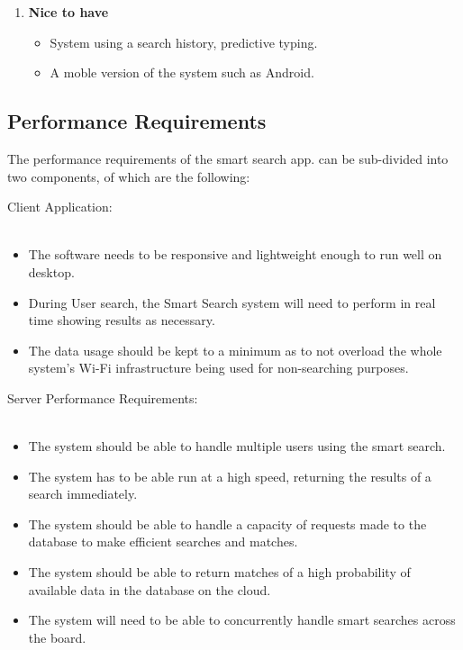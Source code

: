\documentclass[a4paper,10pt]{article}
\begin{document}
{\begin{enumerate}
		\item \textbf{Nice to have}
		\begin{itemize}
		\item System using a search history, predictive typing. 
		\item A moble version of the system such as Android.
		\end{itemize}
		\end{enumerate} 

	\subsection{Performance Requirements}
	The performance requirements of the smart search app. can be sub-divided into two components, of which are the following:
	
	\item Client Application:\\\\
		\begin{itemize}
		\item The software needs to be responsive and lightweight enough to run well on desktop.\\
		\item During User search, the Smart Search system will need to perform in real time showing results as necessary.\\
		\item The data usage should be kept to a minimum as to not overload the whole system's Wi-Fi infrastructure being used for non-searching purposes.\\
		\end{itemize}
	
	\item Server Performance Requirements:\\\\
		\begin{itemize}
		\item The system should be able to handle multiple users using the smart search.\\
		\item The system has to be able run at a high speed, returning the results of a search immediately.\\
		\item The system should be able to handle a capacity of requests made to the database to make efficient searches and matches. \\
		\item The system should be able to return matches of a high probability of available data in the database on the cloud.\\
		\item The system will need to be able to concurrently handle smart searches across the board.
		

\end{itemize}}
\end{document}
